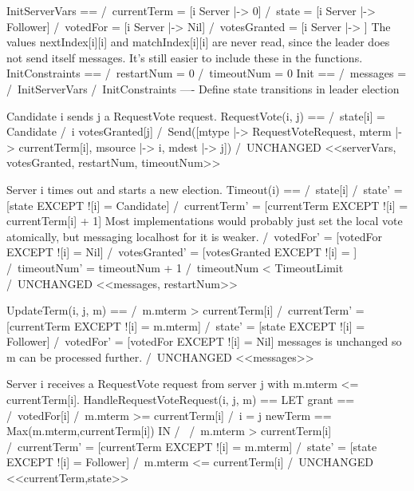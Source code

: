 InitServerVars == /\ currentTerm = [i \in Server |-> 0]
                  /\ state       = [i \in Server |-> Follower]
                  /\ votedFor    = [i \in Server |-> Nil]
                  /\ votesGranted   = [i \in Server |-> {}]
\* The values nextIndex[i][i] and matchIndex[i][i] are never read, since the
\* leader does not send itself messages. It's still easier to include these
\* in the functions.
InitConstraints == /\ restartNum = 0
                   /\ timeoutNum = 0
Init == /\ messages = {}
        /\ InitServerVars
        /\ InitConstraints
----
\* Define state transitions in leader election

\* Candidate i sends j a RequestVote request.
RequestVote(i, j) ==
    /\ state[i] = Candidate
    /\ i \notin votesGranted[j]
    /\ Send([mtype         |-> RequestVoteRequest,
             mterm         |-> currentTerm[i],
             msource       |-> i,
             mdest         |-> j])
    /\ UNCHANGED <<serverVars, votesGranted, restartNum, timeoutNum>>
                   
\* Server i times out and starts a new election.
Timeout(i) == /\ state[i] 
              /\ state' = [state EXCEPT ![i] = Candidate]
              /\ currentTerm' = [currentTerm EXCEPT 
                                ![i] = currentTerm[i] + 1]
              \* Most implementations would probably just set the local vote
              \* atomically, but messaging localhost for it is weaker.
              /\ votedFor' = [votedFor EXCEPT ![i] = Nil]
              /\ votesGranted'   = [votesGranted EXCEPT 
                                   ![i] = {}]
              /\ timeoutNum'     = timeoutNum + 1
              /\ timeoutNum      < TimeoutLimit
              /\ UNCHANGED <<messages, restartNum>>

UpdateTerm(i, j, m) ==
    /\ m.mterm > currentTerm[i]
    /\ currentTerm'    = [currentTerm EXCEPT ![i] = m.mterm]
    /\ state'          = [state       EXCEPT ![i] = Follower]
    /\ votedFor'       = [votedFor    EXCEPT ![i] = Nil]
       \* messages is unchanged so m can be processed further.
    /\ UNCHANGED <<messages>>

\* Server i receives a RequestVote request from server j with
\* m.mterm <= currentTerm[i].
HandleRequestVoteRequest(i, j, m) ==
    LET grant == \/ /\ votedFor[i] 
                    /\ m.mterm >= currentTerm[i]
                 \/ /\ i = j
        newTerm == Max({m.mterm,currentTerm[i]})
    IN
       /\ \/ /\ m.mterm > currentTerm[i]
             /\ currentTerm' = [currentTerm EXCEPT ![i] = m.mterm]
             /\ state'       = [state       EXCEPT ![i] = Follower]
          \/ /\ m.mterm <= currentTerm[i]
             /\ UNCHANGED <<currentTerm,state>>
             
